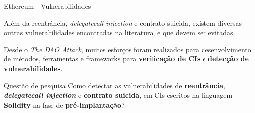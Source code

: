 
\begin{frame}{Ethereum - Vulnerabilidades}
    \begin{block}{}
    Além da reentrância, \textit{delegatecall injection} e contrato suicida, existem diversas outras vulnerabilidades encontradas na literatura, e que devem ser evitadas.
    \end{block}
    \begin{block}{}
    Desde o \textit{The DAO Attack}, muitos esforços foram realizados para desenvolvimento de métodos, ferramentas e frameworks para \textbf{verificação de CIs} e \textbf{detecção de vulnerabilidades}.
    \end{block}
	\begin{exampleblock}{Questão de pesquisa}
	Como detectar as vulnerabilidades de \textbf{reentrância}, \textbf{\textit{delegatecall injection}} e \textbf{contrato suicida}, em CIs escritos na linguagem \textbf{Solidity} na fase de \textbf{pré-implantação}?	
	\end{exampleblock}
\end{frame}

